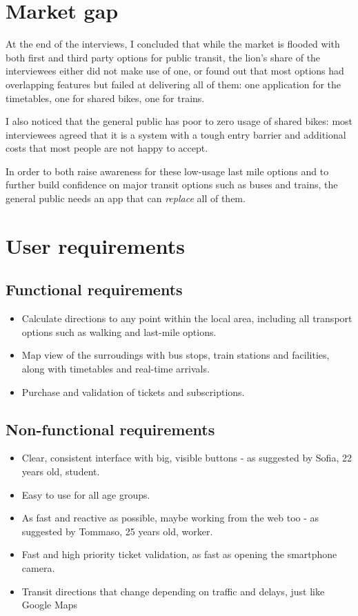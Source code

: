 \documentclass[11pt]{article}
\begin{document}
\section{Market gap}

At the end of the interviews, I concluded that while the market is flooded with both first and third party options for public transit, the lion's share of the interviewees either did not make use of one, or found out that most options had overlapping features but failed at delivering all of them: one application for the timetables, one for shared bikes, one for trains.

I also noticed that the general public has poor to zero usage of shared bikes: most interviewees agreed that it is a system with a tough entry barrier and additional costs that most people are not happy to accept.

In order to both raise awareness for these low-usage last mile options and to further build confidence on major transit options such as buses and trains, the general public needs an app that can \textit{replace} all of them.

\section{User requirements}

\subsection{Functional requirements}
\begin{itemize}
    \item Calculate directions to any point within the local area, including all transport options such as walking and last-mile options.
    \item Map view of the surroudings with bus stops, train stations and facilities, along with timetables and real-time arrivals.
    \item Purchase and validation of tickets and subscriptions.
\end{itemize}

\subsection{Non-functional requirements}

\begin{itemize}
    \item Clear, consistent interface with big, visible buttons - as suggested by Sofia, 22 years old, student.
    \item Easy to use for all age groups.
    \item As fast and reactive as possible, maybe working from the web too - as suggested by Tommaso, 25 years old, worker.
    \item Fast and high priority ticket validation, as fast as opening the smartphone camera.
    \item Transit directions that change depending on traffic and delays, just like Google Maps
\end{itemize}
\end{document}

